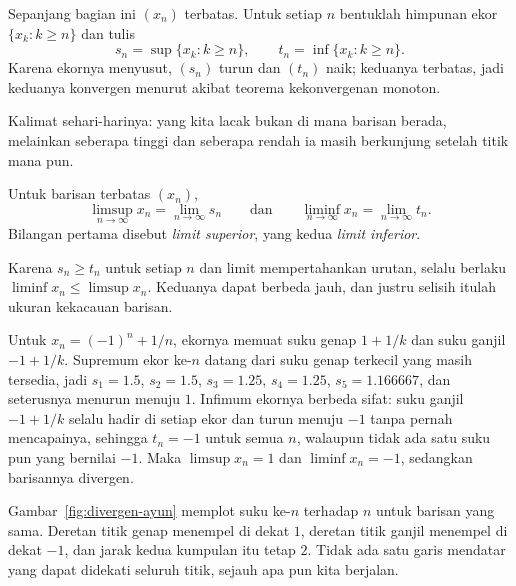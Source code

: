 Sepanjang bagian ini $(x_n)$ terbatas. Untuk setiap $n$ bentuklah himpunan ekor
$\{x_k : k \ge n\}$ dan tulis
\[
s_n=\sup\{x_k : k \ge n\}, \qquad t_n=\inf\{x_k : k \ge n\}.
\]
Karena ekornya menyusut, $(s_n)$ turun dan $(t_n)$ naik; keduanya terbatas, jadi
keduanya konvergen menurut akibat teorema kekonvergenan monoton.

Kalimat sehari-harinya: yang kita lacak bukan di mana barisan berada, melainkan
seberapa tinggi dan seberapa rendah ia masih berkunjung setelah titik mana pun.

\begin{definisi}
Untuk barisan terbatas $(x_n)$,
\[
\limsup_{n\to\infty} x_n = \lim_{n\to\infty} s_n
\qquad \text{dan} \qquad
\liminf_{n\to\infty} x_n = \lim_{n\to\infty} t_n .
\]
Bilangan pertama disebut \emph{limit superior}, yang kedua
\emph{limit inferior}.
\end{definisi}

Karena $s_n \ge t_n$ untuk setiap $n$ dan limit mempertahankan urutan, selalu
berlaku $\liminf x_n \le \limsup x_n$. Keduanya dapat berbeda jauh, dan justru
selisih itulah ukuran kekacauan barisan.

\begin{contoh}
Untuk $x_n=(-1)^n+1/n$, ekornya memuat suku genap $1+1/k$ dan suku ganjil
$-1+1/k$. Supremum ekor ke-$n$ datang dari suku genap terkecil yang masih
tersedia, jadi $s_1=1.5$, $s_2=1.5$, $s_3=1.25$, $s_4=1.25$, $s_5=1.166667$,
dan seterusnya menurun menuju $1$. Infimum ekornya berbeda sifat: suku ganjil
$-1+1/k$ selalu hadir di setiap ekor dan turun menuju $-1$ tanpa pernah
mencapainya, sehingga $t_n=-1$ untuk semua $n$, walaupun tidak ada satu suku pun
yang bernilai $-1$. Maka $\limsup x_n=1$ dan $\liminf x_n=-1$, sedangkan
barisannya divergen.
\end{contoh}

Gambar~\ref{fig:divergen-ayun} memplot suku ke-$n$ terhadap $n$ untuk barisan yang
sama. Deretan titik genap menempel di dekat $1$, deretan titik ganjil menempel di
dekat $-1$, dan jarak kedua kumpulan itu tetap $2$. Tidak ada satu garis mendatar
yang dapat didekati seluruh titik, sejauh apa pun kita berjalan.

